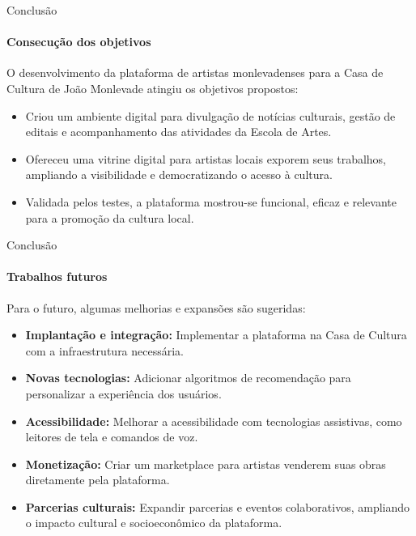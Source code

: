 \begin{frame}{Conclusão}
\framesubtitle{Consecução dos objetivos}
    O desenvolvimento da plataforma de artistas monlevadenses para a Casa de Cultura de João Monlevade atingiu os objetivos propostos:

    \vspace{\baselineskip}
    
    \begin{itemize}
        \item Criou um ambiente digital para divulgação de notícias culturais, gestão de editais e acompanhamento das atividades da Escola de Artes.
        \item Ofereceu uma vitrine digital para artistas locais exporem seus trabalhos, ampliando a visibilidade e democratizando o acesso à cultura.
        \item Validada pelos testes, a plataforma mostrou-se funcional, eficaz e relevante para a promoção da cultura local.
    \end{itemize}
    
    \end{frame}
    
\begin{frame}{Conclusão}
\framesubtitle{Trabalhos futuros}
Para o futuro, algumas melhorias e expansões são sugeridas:

\vspace{\baselineskip}

\begin{itemize}
    \item \textbf{Implantação e integração:} Implementar a plataforma na Casa de Cultura com a infraestrutura necessária.
    \item \textbf{Novas tecnologias:} Adicionar algoritmos de recomendação para personalizar a experiência dos usuários.
    \item \textbf{Acessibilidade:} Melhorar a acessibilidade com tecnologias assistivas, como leitores de tela e comandos de voz.
    \item \textbf{Monetização:} Criar um marketplace para artistas venderem suas obras diretamente pela plataforma.
    \item \textbf{Parcerias culturais:} Expandir parcerias e eventos colaborativos, ampliando o impacto cultural e socioeconômico da plataforma.
\end{itemize}

\end{frame}
